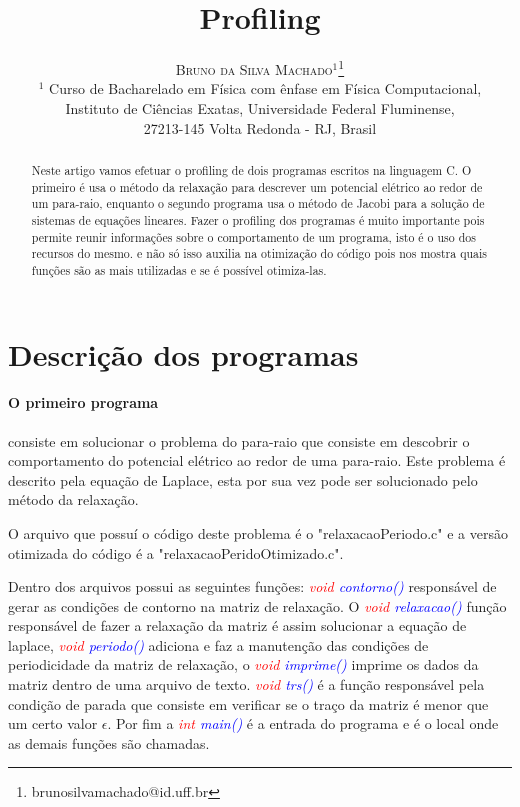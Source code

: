 \documentclass[]{article}
\title{\vspace{-5mm}\fontsize{16pt}{10pt} \bfseries{Profiling}}
\author{\large 
	\textsc{Bruno da Silva Machado$^{1}$}\thanks{brunosilvamachado@id.uff.br} 
	\quad
	\\[2mm] \normalsize 
	$^1$ Curso de Bacharelado em Física com ênfase em Física Computacional,\\ Instituto de Ciências Exatas, Universidade Federal Fluminense,\\ 
	27213-145 Volta Redonda - RJ, Brasil\\
	\vspace{-5mm}}
\begin{document}
\maketitle

\begin{abstract}

Neste artigo vamos efetuar o profiling de dois programas escritos na linguagem C. O primeiro é usa o método da relaxação para descrever um potencial elétrico ao redor de um para-raio, enquanto o segundo programa usa o método de Jacobi para a solução de sistemas de equações lineares. Fazer o profiling dos programas é muito importante pois permite reunir informações sobre o comportamento de um programa, isto é o uso dos recursos do mesmo. e não só isso auxilia na otimização do código pois nos mostra quais funções são as mais utilizadas e se é possível otimiza-las.

\end{abstract}

\section{Descrição dos programas}

\paragraph{O primeiro programa} consiste em solucionar o problema do para-raio que consiste em descobrir o comportamento do potencial elétrico ao redor de uma para-raio. Este problema é descrito pela equação de Laplace, esta por sua vez pode ser solucionado pelo método da relaxação. 

O arquivo que possuí o código deste problema é o "relaxacaoPeriodo.c" e a versão otimizada do código é a  "relaxacaoPeridoOtimizado.c". 

Dentro dos arquivos possui as seguintes funções: \textit{\textcolor{red}{void} \textcolor{blue}{contorno()}} responsável de gerar as condições de contorno na matriz de relaxação. O \textit{\textcolor{red}{void} \textcolor{blue}{relaxacao()}} função responsável de fazer a relaxação da matriz é assim solucionar a equação de laplace, \textit{\textcolor{red}{void} \textcolor{blue}{periodo()}} adiciona e faz a manutenção das condições de periodicidade da matriz de relaxação, o \textit{\textcolor{red}{void} \textcolor{blue}{imprime()}} imprime os dados da matriz dentro de uma arquivo de texto. \textit{\textcolor{red}{void} \textcolor{blue}{trs()}} é a função responsável pela condição de parada que consiste em verificar se o traço da matriz é menor que um certo valor $\epsilon$. Por fim a \textit{\textcolor{red}{int} \textcolor{blue}{main()}} é a entrada do programa e é o local onde as demais funções são chamadas.
\end{document}
